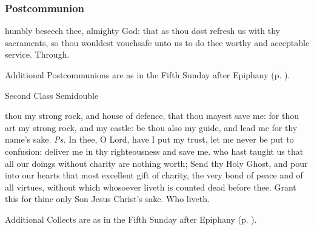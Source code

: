 \vspace{-1ex}


\vspace{-2ex}

\subsubsection{Postcommunion}
{} humbly beseech thee, almighty God: that as thou dost refresh us with thy sacraments, so thou wouldest vouchsafe unto us to do thee worthy and acceptable service. Through.
\begin{secrubric}
    Additional Postcommunions are as in the Fifth Sunday after Epiphany (p. \pageref{EpiphanyVPostcommunion}).
\end{secrubric}

\begin{inhead}
{Second Class Semidouble}
\end{inhead}
\par\noindent
{}



\properantiphonfix

\introit
{} thou my strong rock, and house of defence, that thou mayest save me: for thou art my strong rock, and my castle: be thou also my guide, and lead me for thy name's sake. \textit{Ps.} In thee, O Lord, have I put my trust, let me never be put to confusion: deliver me in thy righteousness and save me.
\collect
{} who hast taught us that all our doings without charity are nothing worth; Send thy Holy Ghost, and pour into our hearts that most excellent gift of charity, the very bond of peace and of all virtues, without which whosoever liveth is counted dead before thee. Grant this for thine only Son Jesus Christ's sake. Who liveth.
\begin{rubric}
    Additional Collects are as in the Fifth Sunday after Epiphany (p. \pageref{EpiphanyVCollect}).
\end{rubric}

